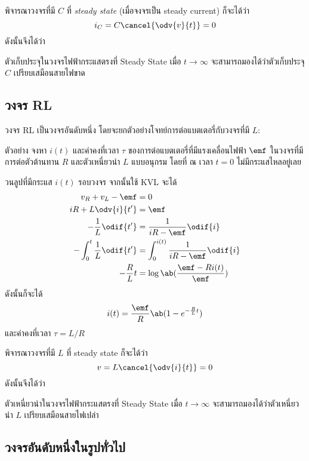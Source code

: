 พิจารณาวงจรที่มี $C$ ที่ \emph{steady state} (เมื่อจงจรเป็น steady current) ก็จะได้ว่า
\[
i_C = C\cancel{\odv{v}{t}} = 0 
\]
ดังนั้นจึงได้ว่า
\begin{lawbox}{ตัวเก็บประจุในวงจรไฟฟ้ากระแสตรงที่ Steady State}
    เมื่อ $t\to\infty$ จะสามารถมองได้ว่าตัวเก็บประจุ $C$ เปรียบเสมือนสายไฟขาด
\end{lawbox}

\subsection{วงจร RL}

วงจร RL เป็นวงจรอันดับหนึ่ง โดยจะยกตัวอย่างโจทย์การต่อแบตเตอรี่กับวงจรที่มี $L$:

\begin{corbox}{ตัวอย่าง}
    จงหา $i(t)$ และค่าคงที่เวลา $\tau$ ของการต่อแบตเตอรี่ที่มีแรงเคลื่อนไฟฟ้า $\emf$ ในวงจรที่มีการต่อตัวต้านทาน $R$ และตัวเหนี่ยวนำ $L$ แบบอนุกรม โดยที่ ณ เวลา $t = 0$ ไม่มีกระแสไหลอยู่เลย
\end{corbox}

\begin{soln}
    วนลูปที่มีกระแส $i(t)$ รอบวงจร จากนั้นใช้ KVL จะได้
    \begin{align*}
        v_R + v_L - \emf &= 0\\
        iR + L\odv{i}{t'} &= \emf\\
        -\frac{1}{L} \odif{t'} &= \frac{1}{iR-\emf} \odif{i}\\
        -\int_0^t \frac{1}{L} \odif{t'} &= \int_0^{i(t)} \frac{1}{iR-\emf}\odif{i}\\
        -\frac{R}{L}t &= \log\ab(\frac{\emf - Ri(t)}{\emf})
    \end{align*}
    ดังนั้นก็จะได้
    \[
    i(t) = \frac{\emf}{R}\ab(1-e^{-\frac{R}{L}t})
    \]
    และค่าคงที่เวลา $\tau = L / R$
\end{soln}

พิจารณาวงจรที่มี $L$ ที่ steady state ก็จะได้ว่า
\[
v = L\cancel{\odv{i}{t}} = 0 
\]
ดังนั้นจึงได้ว่า
\begin{lawbox}{ตัวเหนี่ยวนำในวงจรไฟฟ้ากระแสตรงที่ Steady State}
    เมื่อ $t\to\infty$ จะสามารถมองได้ว่าตัวเหนี่ยวนำ $L$ เปรียบเสมือนสายไฟเปล่า
\end{lawbox}

\subsection{วงจรอันดับหนึ่งในรูปทั่วไป}

